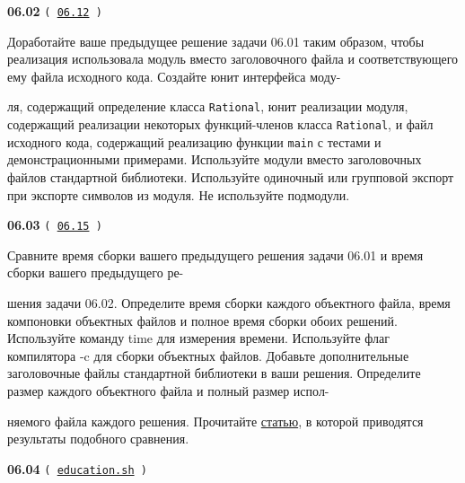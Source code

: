 \documentclass[a4paper,12pt]{article}
\begin{document}
\bigskip

{\large \textbf{06.02} \texttt{(\,\href{https://github.com/i-s-m-mipt/Education/blob/master/projects/examples/source/06.12.cxx}{06.12}\,)}}

\bigskip

Доработайте ваше предыдущее решение задачи 06.01 таким образом, чтобы реализация использовала модуль вместо заголовочного файла и соответствующего ему файла исходного кода. Создайте юнит интерфейса моду-

ля, содержащий определение класса \lstinline{Rational}, юнит реализации модуля, содержащий реализации некоторых функций-членов класса \lstinline{Rational}, и файл исходного кода, содержащий реализацию функции \lstinline{main} с тестами и демонстрационными примерами. Используйте модули вместо заголовочных файлов стандартной библиотеки. Используйте одиночный или групповой экспорт при экспорте символов из модуля. Не используйте подмодули.

\bigskip

{\large \textbf{06.03} \texttt{(\,\href{https://github.com/i-s-m-mipt/Education/blob/master/projects/examples/source/06.15.cpp}{06.15}\,)}}

\bigskip

Сравните время сборки вашего предыдущего решения задачи 06.01 и время сборки вашего предыдущего ре-

шения задачи 06.02. Определите время сборки каждого объектного файла, время компоновки объектных файлов и полное время сборки обоих решений. Используйте команду time для измерения времени. Используйте флаг компилятора -c для сборки объектных файлов. Добавьте дополнительные заголовочные файлы стандартной библиотеки в ваши решения. Определите размер каждого объектного файла и полный размер испол-

няемого файла каждого решения. Прочитайте \href{https://www.open-std.org/jtc1/sc22/wg21/docs/papers/2019/p1441r1.pdf}{статью}, в которой приводятся результаты подобного сравнения.

\bigskip

{\large \textbf{06.04} \texttt{(\,\href{https://github.com/i-s-m-mipt/Education/blob/master/education.sh}{education.sh}\,)}}

\bigskip
\end{document}
